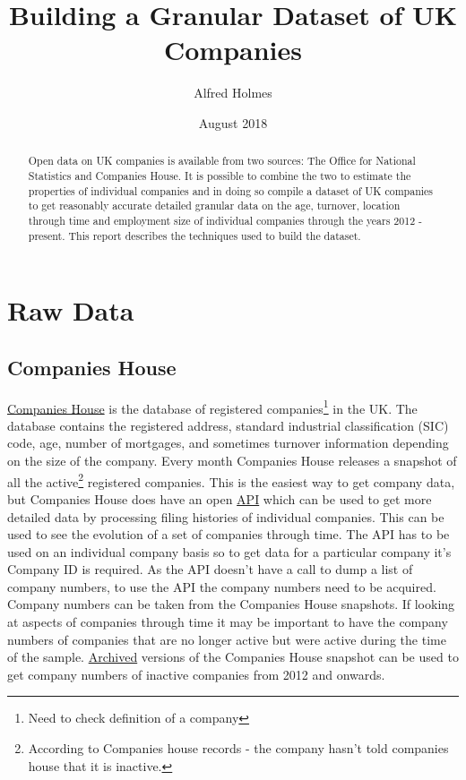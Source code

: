 \documentclass[a4paper,10pt]{article}
\title{Building a Granular Dataset of UK Companies}
\author{Alfred Holmes}
\date{August 2018}
\begin{document}
\maketitle

\begin{abstract}
    Open data on UK companies is available from two sources: The Office for National Statistics and Companies House. It is possible to combine the two to estimate the properties of individual companies and in doing so compile a dataset of UK companies to get reasonably accurate detailed granular data on the age, turnover, location through time and employment size of individual companies through the years 2012 - present. This report describes the techniques used to build the dataset.
\end{abstract}

\section{Raw Data}
\subsection{Companies House}
\href{https://www.gov.uk/government/organisations/companies-house}{Companies House} is the database of registered companies\footnote{Need to check definition of a company} in the UK. The database contains the registered address, standard industrial classification (SIC) code, age, number of mortgages, and sometimes turnover information depending on the size of the company. Every month Companies House releases a snapshot of all the active\footnote{According to Companies house records - the company hasn't told companies house that it is inactive.} registered companies. This is the easiest way to get company data, but Companies House does have an open \href{https://developer.companieshouse.gov.uk/api/docs/}{API} which can be used to get more detailed data by processing filing histories of individual companies. This can be used to see the evolution of a set of companies through time. The API has to be used on an individual company basis so to get data for a particular company it's Company ID is required. As the API doesn't have a call to dump a list of company numbers, to use the API the company numbers need to be acquired. Company numbers can be taken from the Companies House snapshots. If looking at aspects of companies through time it may be important to have the company numbers of companies that are no longer active but were active during the time of the sample. \href{https://web.archive.org/web/*/http://download.companieshouse.gov.uk/en_output.html}{Archived} versions of the Companies House snapshot can be used to get company numbers of inactive companies from 2012 and onwards.
\end{document}
